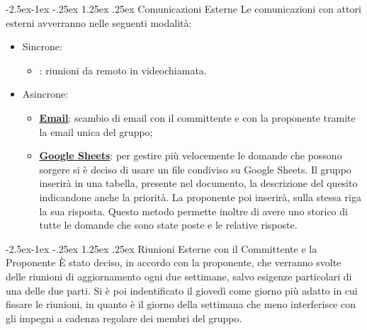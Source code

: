 \documentclass[a4paper,12pt]{article}
\makeatletter
\renewcommand\paragraph{\@startsection{paragraph}{4}{\z@}%
            {-2.5ex\@plus -1ex \@minus -.25ex}%
            {1.25ex \@plus .25ex}%
            {\normalfont\normalsize\bfseries}}
\makeatother
\begin{document}
            \paragraph{Comunicazioni Esterne}
                Le comunicazioni con attori esterni avverranno nelle seguenti modalità:
                \begin{itemize}
                    \item Sincrone:
                        \begin{itemize}
                            \item \textbf{\underline{}}: riunioni da remoto in videochiamata.
                        \end{itemize}
                    \item Asincrone:
                        \begin{itemize}
                            \item \textbf{\underline{\hyperref[strumenti:gmail]{Email}}}: scambio di email con il committente e con la proponente tramite la email unica del gruppo;
                            \item \textbf{\underline{\hyperref[strumenti:googleSheets]{Google Sheets}}}: per gestire più velocemente le domande che possono sorgere si è deciso di usare un file condiviso su Google Sheets.
                                Il gruppo inserirà in una tabella, presente nel documento, la descrizione del quesito indicandone anche la priorità.
                                La proponente poi inserirà, sulla stessa riga la sua risposta. 
                                Questo metodo permette inoltre di avere uno storico di tutte le domande che sono state poste e le relative risposte.
                        \end{itemize}
                \end{itemize}

            \paragraph{Riunioni Esterne con il Committente e la Proponente}
                È stato deciso, in accordo con la proponente, che verranno svolte delle riunioni di aggiornamento ogni due settimane, salvo esigenze particolari di una delle due parti.
                Si è poi indentificato il giovedì come giorno più adatto in cui fissare le riunioni, in quanto è il giorno della settimana che meno interferisce con gli impegni a cadenza regolare dei membri del gruppo.
\end{document}
